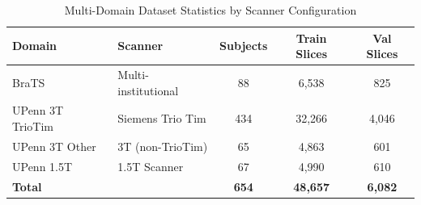 \begin{table}[t]
\centering
\caption{Multi-Domain Dataset Statistics by Scanner Configuration}
\label{tab:domains}
\begin{tabular}{llccc}
\toprule
Domain & Scanner & Subjects & Train Slices & Val Slices \\
\midrule
BraTS & Multi-institutional & 88 & 6,538 & 825 \\
UPenn 3T TrioTim & Siemens Trio Tim & 434 & 32,266 & 4,046 \\
UPenn 3T Other & 3T (non-TrioTim) & 65 & 4,863 & 601 \\
UPenn 1.5T & 1.5T Scanner & 67 & 4,990 & 610 \\
\midrule
\textbf{Total} & & \textbf{654} & \textbf{48,657} & \textbf{6,082} \\
\bottomrule
\end{tabular}
\end{table}
